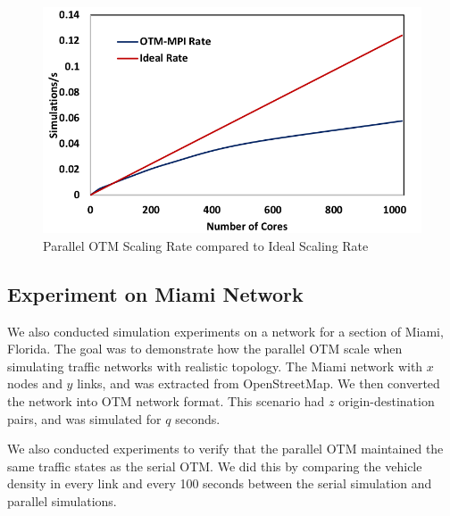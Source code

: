 \begin{figure}[h!]
    \centering
    \includegraphics[width=\columnwidth]{figs/Scaling.png}
    \caption{Parallel OTM Scaling Rate compared to Ideal Scaling Rate}
    \label{fig:scaling}
\end{figure}

\subsection{Experiment on Miami Network}
We also conducted simulation experiments on a network for a section of Miami, Florida. The goal was to demonstrate how the parallel OTM scale when simulating traffic networks with realistic topology. The Miami network with $x$ nodes and $y$ links, and was extracted from OpenStreetMap\cite{haklay2008openstreetmap}. We then converted the network into OTM network format. This scenario had $z$ origin-destination pairs, and was simulated for $q$ seconds. 

We also conducted experiments to verify that the parallel OTM maintained the same traffic states as the serial OTM. We did this by comparing the vehicle density in every link and every 100 seconds between the serial simulation and parallel simulations. 

\vspace{1in}








 








